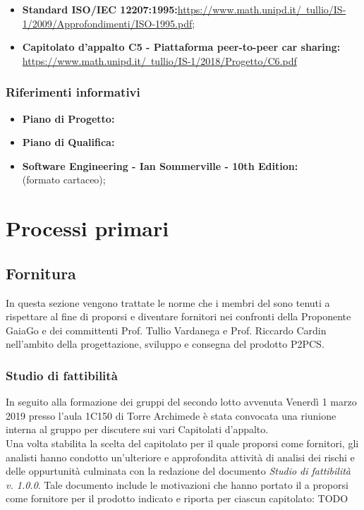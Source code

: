 \documentclass[a4paper]{article}
\begin{document}
\begin{itemize}
	\item  \textbf{Standard ISO/IEC 12207:1995:}\href{https://www.math.unipd.it/~tullio/IS-1/2009/Approfondimenti/ISO_12207-1995.pdf}{https://www.math.unipd.it/~tullio/IS-1/2009/Approfondimenti/ISO-1995.pdf};
	\item \textbf{Capitolato d'appalto C5 - Piattaforma peer-to-peer car sharing:} \href{https://www.math.unipd.it/~tullio/IS- 1/2018/Progetto/C6.pdf}{https://www.math.unipd.it/~tullio/IS-1/2018/Progetto/C6.pdf}
\end{itemize}

\subsubsection {Riferimenti informativi}
\begin{itemize}
	\item \textbf{Piano di Progetto:}
	\item \textbf{Piano di Qualifica:}
	\item \textbf{Software Engineering - Ian Sommerville - 10th Edition: \\}(formato cartaceo);
\end{itemize}
\section {Processi primari}
	\subsection {Fornitura}
	In questa sezione vengono trattate le norme che i membri del \GroupName sono tenuti a rispettare al fine di proporsi e diventare fornitori nei confronti della Proponente GaiaGo e dei committenti Prof. Tullio Vardanega e Prof. Riccardo Cardin nell'ambito della progettazione, sviluppo e consegna del prodotto P2PCS.
		\subsubsection {Studio di fattibilità}
		In seguito alla formazione dei gruppi del secondo lotto avvenuta Venerdì 1 marzo 2019 presso l'aula 1C150 di Torre Archimede è stata convocata una riunione interna al gruppo per discutere sui vari Capitolati d'appalto. \\ Una volta stabilita la scelta del capitolato per il quale proporsi come fornitori, gli analisti hanno condotto un'ulteriore e approfondita attività di analisi dei rischi e delle oppurtunità culminata con la redazione del documento \textit{Studio di fattibilità v. 1.0.0}. Tale documento include le motivazioni che hanno portato il \GroupName a proporsi come fornitore per il prodotto indicato e riporta per ciascun capitolato: TODO
\end{document}
